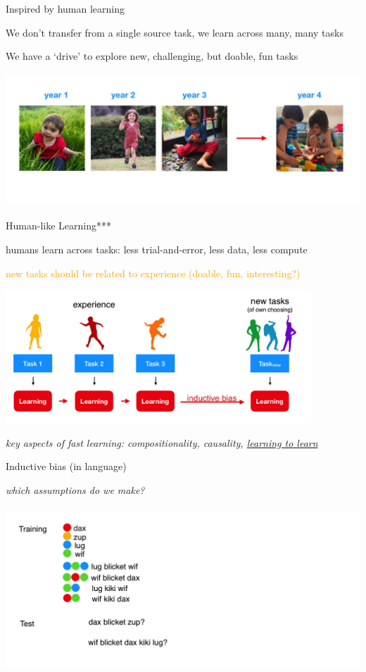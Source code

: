 \begin{frame}{Inspired by human learning}
\centerline{We don’t transfer from a single source task, we learn across many, many tasks}
\centerline{We have a ‘drive’ to explore new, challenging, but doable, fun tasks}
 
\centering\includegraphics[height=5cm]{image/img184210.jpg}

\end{frame}

\begin{frame}{Human-like Learning***}
\centerline{humans learn across tasks: less trial-and-error, less data, less compute}
\centerline{\textcolor{orange}{new tasks should be related to experience (doable, fun, interesting?)}}
 
\centering\includegraphics[height=5cm]{image/img184546.jpg}

\centerline{\textit{key aspects of fast learning: compositionality, causality, \underline{learning to learn}}}
\end{frame}

\begin{frame}{Inductive bias (in language)}
\centerline{\textit{which assumptions do we make?}}
\centering\includegraphics[height=6.2cm]{image/img185829.jpg}

\end{frame}

